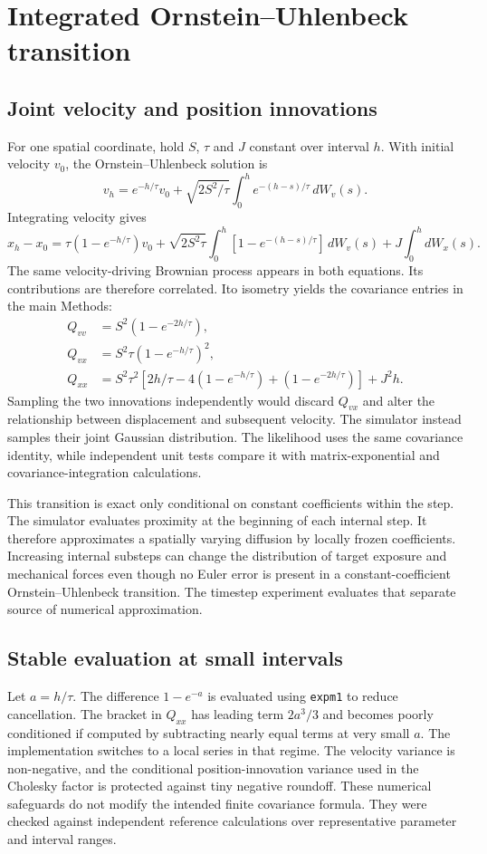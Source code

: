 \documentclass[11pt]{article}
\begin{document}
\section{Integrated Ornstein--Uhlenbeck transition}
\subsection{Joint velocity and position innovations}
For one spatial coordinate, hold $S$, $\tau$ and $J$ constant over interval $h$. With initial velocity $v_0$, the Ornstein--Uhlenbeck solution is
\begin{equation}
 v_h=e^{-h/\tau}v_0+\sqrt{2S^2/\tau}\int_0^h e^{-(h-s)/\tau}\,dW_v(s).
\end{equation}
Integrating velocity gives
\begin{equation}
 x_h-x_0=\tau(1-e^{-h/\tau})v_0+\sqrt{2S^2\tau}\int_0^h[1-e^{-(h-s)/\tau}]\,dW_v(s)+J\int_0^h dW_x(s).
\end{equation}
The same velocity-driving Brownian process appears in both equations. Its contributions are therefore correlated. Ito isometry yields the covariance entries in the main Methods:
\begin{align}
 Q_{vv}&=S^2(1-e^{-2h/\tau}),\\
 Q_{vx}&=S^2\tau(1-e^{-h/\tau})^2,\\
 Q_{xx}&=S^2\tau^2[2h/\tau-4(1-e^{-h/\tau})+(1-e^{-2h/\tau})]+J^2h.
\end{align}
Sampling the two innovations independently would discard $Q_{vx}$ and alter the relationship between displacement and subsequent velocity. The simulator instead samples their joint Gaussian distribution. The likelihood uses the same covariance identity, while independent unit tests compare it with matrix-exponential and covariance-integration calculations.

This transition is exact only conditional on constant coefficients within the step. The simulator evaluates proximity at the beginning of each internal step. It therefore approximates a spatially varying diffusion by locally frozen coefficients. Increasing internal substeps can change the distribution of target exposure and mechanical forces even though no Euler error is present in a constant-coefficient Ornstein--Uhlenbeck transition. The timestep experiment evaluates that separate source of numerical approximation.

\subsection{Stable evaluation at small intervals}
Let $a=h/\tau$. The difference $1-e^{-a}$ is evaluated using \texttt{expm1} to reduce cancellation. The bracket in $Q_{xx}$ has leading term $2a^3/3$ and becomes poorly conditioned if computed by subtracting nearly equal terms at very small $a$. The implementation switches to a local series in that regime. The velocity variance is non-negative, and the conditional position-innovation variance used in the Cholesky factor is protected against tiny negative roundoff. These numerical safeguards do not modify the intended finite covariance formula. They were checked against independent reference calculations over representative parameter and interval ranges.
\end{document}
